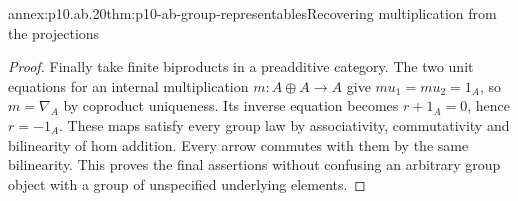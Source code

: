 \begin{annexitem}{annex:p10.ab.20}{thm:p10-ab-group-representables}{Recovering multiplication from the projections}
\begin{proof}
Finally take finite biproducts in a preadditive category. The two unit
equations for an internal multiplication \(m:A\oplus A\to A\)
give \(mu_1=mu_2=1_A\), so \(m=\nabla_A\) by coproduct
uniqueness. Its inverse equation becomes \(r+1_A=0\), hence
\(r=-1_A\). These maps satisfy every group law by associativity,
commutativity and bilinearity of hom addition. Every arrow commutes
with them by the same bilinearity. This proves the final assertions
without confusing an arbitrary group object with a group of unspecified
underlying elements.
\end{proof}
\end{annexitem}
